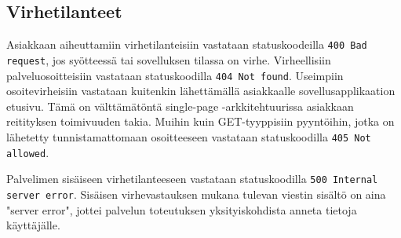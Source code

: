 \documentclass[a4paper,parskip=half]{scrartcl}
\begin{document}
\subsection{Virhetilanteet}

Asiakkaan aiheuttamiin virhetilanteisiin vastataan statuskoodeilla \texttt{400
Bad request}, jos syötteessä tai sovelluksen tilassa on virhe. Virheellisiin
palveluosoitteisiin vastataan statuskoodilla \texttt{404 Not found}. Useimpiin
osoitevirheisiin vastataan kuitenkin lähettämällä asiakkaalle
sovellusapplikaation etusivu. Tämä on välttämätöntä single-page
-arkkitehtuurissa asiakkaan reitityksen toimivuuden takia. Muihin kuin
GET-tyyppisiin pyyntöihin, jotka on lähetetty tunnistamattomaan osoitteeseen
vastataan statuskoodilla \texttt{405 Not allowed}.

Palvelimen sisäiseen virhetilanteeseen vastataan statuskoodilla \texttt{500
Internal server error}. Sisäisen virhevastauksen mukana tulevan viestin sisältö
on aina "server error", jottei palvelun toteutuksen yksityiskohdista anneta
tietoja käyttäjälle.



\end{document}
